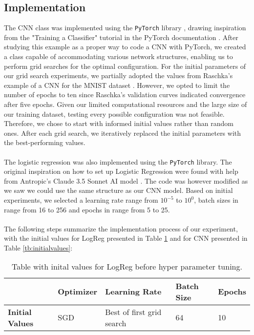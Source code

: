 \subsection{Implementation}

The CNN class was implemented using the \texttt{PyTorch} library \cite{Paszke2019}, drawing inspiration from the "Training a Classifier" tutorial in the PyTorch documentation \cite{pytorch_cifar10_tutorial}. After studying this example as a proper way to code a CNN with PyTorch, we created a class capable of accommodating various network structures, enabling us to perform grid searches for the optimal configuration. For the initial parameters of our grid search experiments, we partially adopted the values from Raschka's example of a CNN for the MNIST dataset \cite{raschka2022machine}. However, we opted to limit the number of epochs to ten since Raschka's validation curves indicated convergence after five epochs. Given our limited computational resources and the large size of our training dataset, testing every possible configuration was not feasible. Therefore, we chose to start with informed initial values rather than random ones. After each grid search, we iteratively replaced the initial parameters with the best-performing values.
\\
\\
The logistic regression was also implemented using the \texttt{PyTorch} library. The original inspiration on how to set up Logistic Regression were found with help from Antropic's Claude 3.5 Sonnet AI model \cite{anthropic_claude_3_5_sonnet}. The code was however modified as we saw we could use the same structure as our CNN model. Based on initial experiments, we selected a learning rate range from \( 10^{-5}\) to \( 10^0 \), batch sizes in range from 16 to 256 and epochs in range from 5 to 25. 
\\
\\
The following steps summarize the implementation process of our experiment, with the initial values for LogReg presented in Table \ref{tb:loginitial} and for CNN presented in Table \ref{tb:initialvalues}:

\begin{table}[H]
 \centering
    \caption{Table with inital values for LogReg before hyper parameter tuning.}
\begin{tabular}{|l|l|l|l|l|}
\hline
                        & \textbf{Optimizer} & \textbf{Learning Rate}    & \textbf{Batch Size} & \textbf{Epochs} \\ \hline
\textbf{Initial Values} & SGD                & Best of first grid search & 64                  & 10              \\ \hline
\end{tabular}
\label{tb:loginitial}
\end{table}

